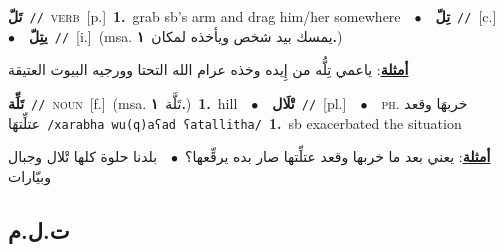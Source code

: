 \documentclass[10pt,a4paper,twoside]{article} %
\begin{document}
\begin{multicols}{2}
{\setlength\topsep{0pt}\textbf{\foreignlanguage{arabic}{تَلّ}}\ {\color{gray}\texttt{//}\color{black}}\ \textsc{verb}\ [p.]\ \textbf{1.}~grab sb's arm and drag him/her somewhere\ \ $\bullet$\ \ \setlength\topsep{0pt}\textbf{\foreignlanguage{arabic}{تِلّ}}\ {\color{gray}\texttt{//}\color{black}}\ [c.]\ \ $\bullet$\ \ \setlength\topsep{0pt}\textbf{\foreignlanguage{arabic}{يتِلّ}}\ {\color{gray}\texttt{//}\color{black}}\ [i.]\ \color{gray}(msa. \foreignlanguage{arabic}{يمسك بيد شخص ويأخذه لمكان}~\foreignlanguage{arabic}{\textbf{١.}})\color{black}\  \begin{flushright}\color{gray}\foreignlanguage{arabic}{\textbf{\underline{\foreignlanguage{arabic}{أمثلة}}}: ياعمي تِلُّه من إِيده وخذه عرام الله التحتا وورجيه البيوت العتيقة}\end{flushright}\color{black}} \vspace{2mm}

{\setlength\topsep{0pt}\textbf{\foreignlanguage{arabic}{تَلِّة}}\ {\color{gray}\texttt{//}\color{black}}\ \textsc{noun}\ [f.]\ \color{gray}(msa. \foreignlanguage{arabic}{تَلَّة}~\foreignlanguage{arabic}{\textbf{١.}})\color{black}\ \textbf{1.}~hill\ \ $\bullet$\ \ \setlength\topsep{0pt}\textbf{\foreignlanguage{arabic}{تْلَال}}\ {\color{gray}\texttt{//}\color{black}}\ [pl.]\ \ $\bullet$\ \ \textsc{ph.} \color{gray} \foreignlanguage{arabic}{خربهَا وقعد عتلِّتهَا}\color{black}\ {\color{gray}\texttt{/{\sffamily xarabha wu(q)aʕad ʕatallitha}/}\color{black}}\ \textbf{1.}~sb exacerbated the situation\  \begin{flushright}\color{gray}\foreignlanguage{arabic}{\textbf{\underline{\foreignlanguage{arabic}{أمثلة}}}: يعني بعد ما خربها وقعد عتلِّتها صار بده يرقِّعها؟\ $\bullet$\ \  بلدنا حلوة كلها تْلال وجبال وبيّارات}\end{flushright}\color{black}} \vspace{2mm}

\vspace{-3mm}
\subsection*{\color{blue}\foreignlanguage{arabic}{ت.ل.م}\color{blue}{}} 


\end{multicols}
\end{document}
